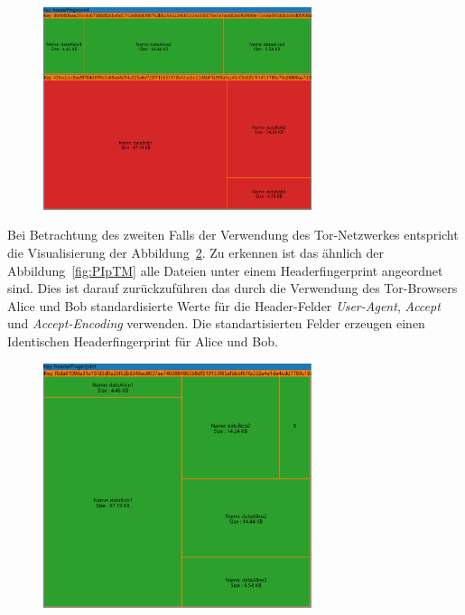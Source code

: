 \documentclass[
    fontsize=12pt,
    headings=small,
    parskip=half,           %
    bibliography=totoc,
    numbers=noenddot,       %
    open=any,               %
    ]{scrreprt}
\begin{document}
\begin{figure}[H]
\includegraphics[width=0.7\textwidth]{../pic/Header-Proxy-SetA.png}
\label{fig:PHTM}
\end{figure}

Bei Betrachtung des zweiten Falls der Verwendung des Tor-Netzwerkes entspricht die Visualisierung der Abbildung~\ref{fig:THTM}.
Zu erkennen ist das ähnlich der Abbildung~\ref{fig:PIpTM} alle Dateien unter einem Headerfingerprint angeordnet sind.
Dies ist darauf zurückzuführen das durch die Verwendung des Tor-Browsers Alice und Bob standardisierte Werte für die Header-Felder \textit{User-Agent}, \textit{Accept} und \textit{Accept-Encoding} verwenden.
Die standartisierten Felder erzeugen einen Identischen Headerfingerprint für Alice und Bob.

\begin{figure}[H]
\includegraphics[width=0.7\textwidth]{../pic/Header-Tor-SetB.png}
\label{fig:THTM}
\end{figure}
\end{document}
